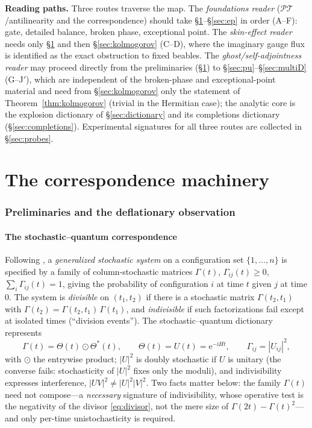 \documentclass[11pt]{article}
\theoremstyle{definition}
\theoremstyle{remark}
\newcommand{\PT}{\mathcal{PT}}
\newcommand{\ii}{\mathrm{i}}
\newcommand{\ee}{\mathrm{e}}
\newcommand{\Gam}{\Gamma}
\begin{document}
\textbf{Reading paths.} Three routes traverse the map. The
\emph{foundations reader} ($\PT$/antilinearity and the correspondence)
should take \S\ref{sec:deflation}--\S\ref{sec:ep} in order
(A--F): gate, detailed balance, broken phase, exceptional point.
The \emph{skin-effect reader} needs only \S\ref{sec:deflation} and
then \S\ref{sec:kolmogorov} (C--D), where the imaginary gauge flux is
identified as the exact obstruction to fixed beables. The
\emph{ghost/self-adjointness reader} may proceed directly from the
preliminaries (\S\ref{sec:deflation}) to
\S\ref{sec:pu}--\S\ref{sec:multiD} (G--J$'$), which are independent of
the broken-phase and exceptional-point material and need from
\S\ref{sec:kolmogorov} only the statement of
Theorem~\ref{thm:kolmogorov} (trivial in the Hermitian case); the analytic core is
the explosion dictionary of \S\ref{sec:dictionary} and its completions
dictionary (\S\ref{sec:completions}). Experimental
signatures for all three routes are collected in \S\ref{sec:probes}.

\part{The correspondence machinery}

\section{Preliminaries and the deflationary observation}
\label{sec:deflation}

\subsection{The stochastic--quantum correspondence}

Following \cite{Barandes2023,Barandes2025}, a \emph{generalized stochastic
system} on a configuration set $\{1,\dots,n\}$ is specified by a family of
column-stochastic matrices $\Gam(t)$, $\Gam_{ij}(t)\ge 0$,
$\sum_i\Gam_{ij}(t)=1$, giving the probability of configuration $i$ at time
$t$ given $j$ at time $0$. The system is \emph{divisible} on $(t_1,t_2)$ if
there is a stochastic matrix $\Gam(t_2,t_1)$ with
$\Gam(t_2)=\Gam(t_2,t_1)\,\Gam(t_1)$, and \emph{indivisible} if such
factorizations fail except at isolated times (``division events'').
The stochastic--quantum dictionary represents
\begin{equation}
\Gam(t)=\Theta(t)\odot\Theta^{*}(t),
\qquad
\Theta(t)=U(t)=\ee^{-\ii H t},
\qquad
\Gam_{ij}=|U_{ij}|^{2},
\label{eq:dictionary}
\end{equation}
with $\odot$ the entrywise product; $|U|^{2}$ is doubly stochastic if $U$
is unitary (the converse fails: stochasticity of $|U|^2$ fixes only
the moduli), and indivisibility expresses interference,
$|UV|^{2}\ne|U|^{2}|V|^{2}$. Two facts matter below: the family
$\Gam(t)$ need not compose---a \emph{necessary} signature of
indivisibility, whose operative test is the negativity of the divisor
\eqref{eq:divisor}, not the mere size of $\Gam(2t)-\Gam(t)^{2}$---and
only per-time unistochasticity is required.
\end{document}
